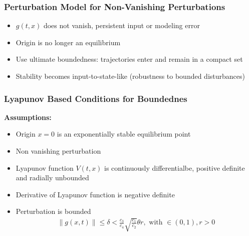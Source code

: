 \documentclass[student, noshadow, lsr, english, aspectratio=169, t]{ITR_LSR_slides}
\begin{document}
\begin{frame}
	\frametitle{Perturbation Model for Non-Vanishing Perturbations}
	\begin{itemize}
        \item $g(t,x)$ does not vanish, persistent input or modeling error
        \item Origin is no longer an equilibrium
        \item Use ultimate boundedness: trajectories enter and remain in a compact set
        \item Stability becomes input-to-state-like (robustness to bounded disturbances)
    \end{itemize}
\end{frame}

\begin{frame}
	\frametitle{Lyapunov Based Conditions for Boundednes}
	\textbf{Assumptions:}
	\begin{itemize}
		\item Origin $x=0$ is an exponentially stable equilibrium point
		\item Non vanishing perturbation
		\item Lyapunov function $V(t,x)$ is continuously differentialbe, positive definite and radially unbounded
		\item Derivative of Lyapunov function is negative definite
		\item Perturbation is bounded
		\begin{align*}
			\|g(x,t)\| \leq \delta<\frac{c_3}{c_4}\sqrt{\frac{c_1}{c_2}}\theta r, \text{ with } \in(0,1), r>0
		\end{align*}
	\end{itemize}
\end{frame}
\end{document}
